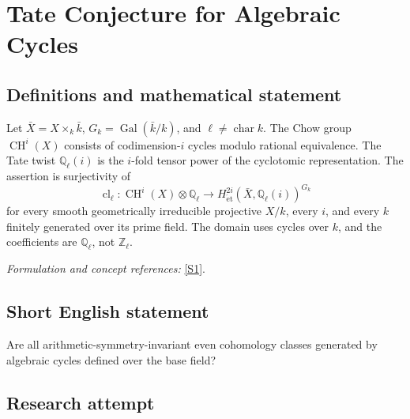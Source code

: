 \documentclass[11pt,a4paper]{article}
\newcommand{\Z}{\mathbb{Z}}
\newcommand{\Q}{\mathbb{Q}}
\newcommand{\sref}[2]{\hyperlink{source:#1:#2}{[S#2]}}
\newif\ifshowcatalogue
\newcommand{\cataloguescope}[1]{\ifshowcatalogue
 \paragraph{Exact scope in the supplied catalogue.}
 \begin{quote}\small #1\end{quote}\fi}
\begin{document}
\setcounter{section}{0}
\clearpage
\section*{\texorpdfstring{Tate Conjecture for Algebraic Cycles}{Tate Conjecture for Algebraic Cycles}}\label{30006680}
\subsection{Definitions and mathematical statement}
Let $\bar X=X\times_k\bar k$, $G_k=\operatorname{Gal}(\bar k/k)$, and $\ell\ne\operatorname{char}k$. The Chow group $\operatorname{CH}^i(X)$ consists of codimension-$i$ cycles modulo rational equivalence. The Tate twist $\Q_\ell(i)$ is the $i$-fold tensor power of the cyclotomic representation. The assertion is surjectivity of
\[
 \operatorname{cl}_\ell:\operatorname{CH}^i(X)\otimes\Q_\ell
 \longrightarrow H^{2i}_{\mathrm{\acute et}}(\bar X,\Q_\ell(i))^{G_k}
\]
for every smooth geometrically irreducible projective $X/k$, every $i$, and every $k$ finitely generated over its prime field. The domain uses cycles over $k$, and the coefficients are $\Q_\ell$, not $\Z_\ell$.
\par\smallskip\textit{Formulation and concept references:} \sref{30006680}{1}.
\cataloguescope{For every smooth geometrically irreducible projective variety X over a field k finitely generated over its prime field, every codimension i, and every prime l different from char(k), prove that the l-adic cycle-class map from codimension-i algebraic cycle classes defined over k, tensored with Q\_l, is surjective onto H\textasciicircum{}(2i)(X\_bar,Q\_l(i))\textasciicircum{}Gal(k\_bar/k).}
\subsection{Short English statement}
Are all arithmetic-symmetry-invariant even cohomology classes generated by algebraic cycles defined over the base field?
\subsection{Research attempt}
\end{document}
